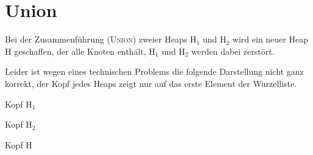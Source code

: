 \section{Union}
Bei der Zusammenführung (\textsc{Union}) zweier Heaps H$_1$ und H$_2$ wird ein neuer Heap H geschaffen, der alle Knoten
enthält, H$_1$ und H$_2$ werden dabei zerstört.

%   
%  

Leider ist wegen eines technischen Problems die folgende Darstellung nicht ganz kor\-rekt, der Kopf jedes Heaps zeigt nur
auf das erste Element der Wurzelliste.

\begin{bundle}{Kopf H$_1$}
  
\end{bundle} \hspace{15mm}
\begin{bundle}{Kopf H$_2$}
  
\end{bundle}\hspace{15mm}
\begin{bundle}{Kopf H}
\end{bundle}

